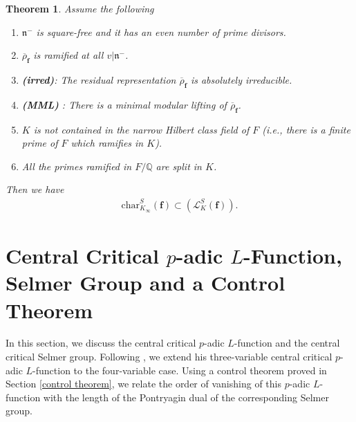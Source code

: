 \documentclass[reqno,10pt]{amsart}
\newcommand{\q}{\mathbb{Q}}
\newcommand{\f}{\mathbf{f}}
\theoremstyle{plain}
\newtheorem{thm}{Theorem}[section]
\theoremstyle{definition}
\begin{document}
\begin{thm} \label{WanMainResult}
    Assume the following
\begin{enumerate}
    \item $\mathfrak{n}^-$ is square-free and it has an even number of prime divisors.

    \item $\overline{\rho}_\f$ is ramified at all $v|\mathfrak{n}^-$.

    \item \textbf{(irred)}: The residual representation $\overline{\rho}_\f$ is absolutely irreducible.

    \item \textbf{(MML)} : There is a minimal modular lifting of $\overline{\rho}_\f$. 

    \item  $K$ is not contained in the narrow Hilbert class field of $F$ (i.e., there is a finite prime of $F$ which ramifies in $K$).

    \item All the primes ramified in $F/\q$ are split in $K$.
\end{enumerate}
Then we have
    \begin{align*}
        \mathrm{char}^S_{K_\infty}(\f) \subset (\mathcal{L}^S_K(\f)).
    \end{align*}
\end{thm}

\section{Central Critical $p$-adic $L$-Function, Selmer Group and a Control Theorem}
In this section, we discuss the central critical $p$-adic $L$-function and the central critical Selmer group. Following \cite{Rodolfo}, we extend his three-variable central critical $p$-adic $L$-function to the four-variable case. Using a control theorem proved in Section \ref{control theorem}, we relate the order of vanishing of this $p$-adic $L$-function with the length of the Pontryagin dual of the corresponding Selmer group.
\end{document}
